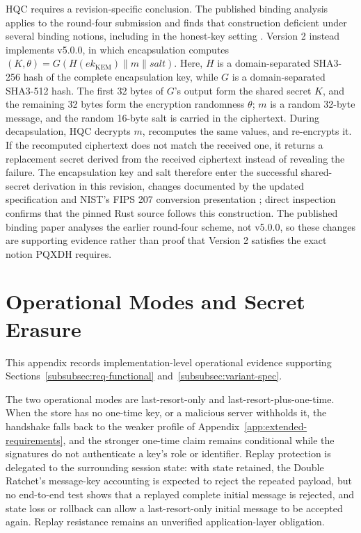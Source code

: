 HQC requires a revision-specific conclusion. The published binding analysis applies to the round-four submission and finds that construction deficient under several binding notions, including in the honest-key setting \cite{noauthor_binding_nodate}. Version 2 instead implements v5.0.0, in which encapsulation computes \((K,\theta)=G(H(ek_{\mathrm{KEM}}) \parallel m \parallel salt)\). Here, \(H\) is a domain-separated SHA3-256 hash of the complete encapsulation key, while \(G\) is a domain-separated SHA3-512 hash. The first 32 bytes of \(G\)'s output form the shared secret \(K\), and the remaining 32 bytes form the encryption randomness \(\theta\); \(m\) is a random 32-byte message, and the random 16-byte salt is carried in the ciphertext. During decapsulation, HQC decrypts \(m\), recomputes the same values, and re-encrypts it. If the recomputed ciphertext does not match the received one, it returns a replacement secret derived from the received ciphertext instead of revealing the failure. The encapsulation key and salt therefore enter the successful shared-secret derivation in this revision, changes documented by the updated specification and NIST's FIPS 207 conversion presentation \cite{aguilar-melchor_hqc_nodate,csrcdatamodelspresentationspresentersjsonobject_csrc_2025}; direct inspection confirms that the pinned Rust source follows this construction. The published binding paper analyses the earlier round-four scheme, not v5.0.0, so these changes are supporting evidence rather than proof that Version 2 satisfies the exact notion PQXDH requires.

\section{Operational Modes and Secret Erasure}
\label{app:spec-operational}

This appendix records implementation-level operational evidence supporting Sections~\ref{subsubsec:req-functional} and~\ref{subsubsec:variant-spec}.

The two operational modes are last-resort-only and last-resort-plus-one-time. When the store has no one-time key, or a malicious server withholds it, the handshake falls back to the weaker profile of Appendix~\ref{app:extended-requirements}, and the stronger one-time claim remains conditional while the signatures do not authenticate a key's role or identifier. Replay protection is delegated to the surrounding session state: with state retained, the Double Ratchet's message-key accounting is expected to reject the repeated payload, but no end-to-end test shows that a replayed complete initial message is rejected, and state loss or rollback can allow a last-resort-only initial message to be accepted again. Replay resistance remains an unverified application-layer obligation.

